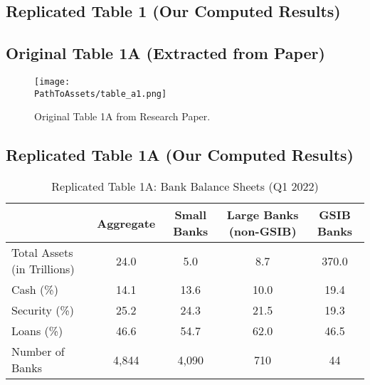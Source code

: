 \documentclass{article}
\begin{document}

\subsection{Replicated Table 1 (Our Computed Results)}


\subsection{Original Table 1A (Extracted from Paper)}
\begin{figure}[H]
    \centering
    \texttt{[image: \\PathToAssets/table\_a1.png]}
    \caption{Original Table 1A from Research Paper.}
\end{figure}

\subsection{Replicated Table 1A (Our Computed Results)}
\begin{table}[H]
    \centering
    \caption{Replicated Table 1A: Bank Balance Sheets (Q1 2022)}
    \begin{tabular}{lcccc}
        \toprule
        & Aggregate & Small Banks & Large Banks (non-GSIB) & GSIB Banks \\
        \midrule
        Total Assets (in Trillions) & 24.0 & 5.0 & 8.7 & 370.0 \\
        Cash (\%) & 14.1 & 13.6 & 10.0 & 19.4 \\
        Security (\%) & 25.2 & 24.3 & 21.5 & 19.3 \\
        Loans (\%) & 46.6 & 54.7 & 62.0 & 46.5 \\
        Number of Banks & 4,844 & 4,090 & 710 & 44 \\
        \bottomrule
    \end{tabular}
\end{table}
\end{document}
